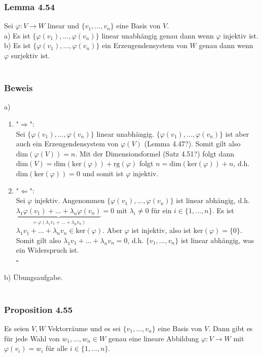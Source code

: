 \documentclass{article}
\begin{document}
\subsubsection*{Lemma 4.54}
Sei $\varphi: V \rightarrow W$ linear und $\{v_1,...,v_n\}$ eine Basis von $V$. \\
a) Es ist $\{\varphi(v_1),...,\varphi(v_n)\}$ linear unabhängig genau dann wenn $\varphi$ injektiv ist. \\
b) Es ist $\{\varphi(v_1),...,\varphi(v_n)\}$ ein Erzeugendensystem von $W$ genau dann wenn $\varphi$ surjektiv ist. \\
\\
\subsubsection*{Beweis}
a) \begin{enumerate}
    \item "$\Rightarrow$": \\
    Sei $\{\varphi(v_1),...,\varphi(v_n)\}$ linear unabhängig. $\{\varphi(v_1),...,\varphi(v_n)\}$ ist aber auch ein Erzeugendensystem von $\varphi(V)$ (Lemma 4.47?). Somit gilt also $\text{dim}(\varphi(V)) = n$.
    Mit der Dimensionsformel (Satz 4.51?) folgt dann $\text{dim}(V) = \text{dim}(\text{ker}(\varphi)) + \text{rg}(\varphi)$ folgt $n = \text{dim}(\text{ker}(\varphi)) + n$, d.h. $\text{dim}(\text{ker}(\varphi)) = 0$ und somit ist $\varphi$ injektiv. \\
    \item "$\Leftarrow$": \\
    Sei $\varphi$ injektiv. Angenommen $\{\varphi(v_1),...,\varphi(v_n)\}$ ist linear abhängig, d.h. $\underbrace{\lambda_1 \varphi(v_1) + ... + \lambda_n \varphi(v_n)}_{=\varphi(\lambda_1 v_1 + ... + \lambda_n v_n)} = 0$ mit $\lambda_i \neq 0$ für ein $i \in \{1,...,n\}$.
    Es ist $\lambda_1 v_1 + ... + \lambda_n v_n \in \text{ker}(\varphi)$. Aber $\varphi$ ist injektiv, also ist $\text{ker}(\varphi) = \{0\}$. 
    Somit gilt also $\lambda_1 v_1 + ... + \lambda_n v_n = 0$, d.h. $\{v_1,...,v_n\}$ ist linear abhängig, was ein Widerspruch ist. \\
    $\square$ \\
\end{enumerate}
b) Übungsaufgabe. \\
\\
\subsubsection*{Proposition 4.55}
Es seien $V, W$ Vektorräume und es sei $\{v_1,...,v_n\}$ eine Basis von $V$. Dann gibt es für jede Wahl von $w_1,...,w_n \in W$ genau eine lineare Abbildung $\varphi: V \rightarrow W$ mit $\varphi(v_i) = w_i$ für alle $i \in \{1,...,n\}$. \\
\\
\end{document}
